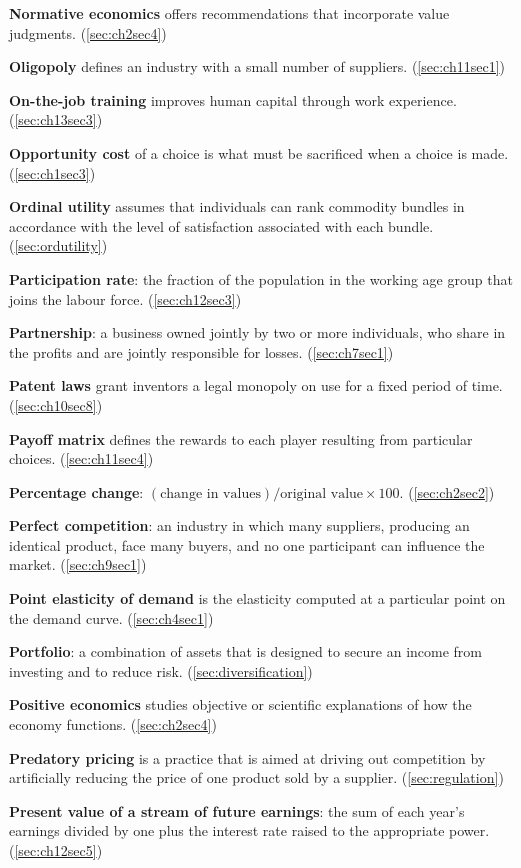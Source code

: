 \textbf{Normative economics} offers recommendations that incorporate value judgments. (\ref{sec:ch2sec4})

\textbf{Oligopoly} defines an industry with a small number of suppliers. (\ref{sec:ch11sec1})

\textbf{On-the-job training} improves human capital through work experience. (\ref{sec:ch13sec3})

\textbf{Opportunity cost} of a choice is what must be sacrificed when a choice is made. (\ref{sec:ch1sec3})

\textbf{Ordinal utility} assumes that individuals can rank commodity bundles in accordance with the level of satisfaction associated with each bundle. (\ref{sec:ordutility})

\textbf{Participation rate}: the fraction of the population in the working age group that joins the labour force. (\ref{sec:ch12sec3})

\textbf{Partnership}: a business owned jointly by two or more individuals, who share in the profits and are jointly responsible for losses. (\ref{sec:ch7sec1})

\textbf{Patent laws} grant inventors a legal monopoly on use for a fixed period of time. (\ref{sec:ch10sec8})

\textbf{Payoff matrix} defines the rewards to each player resulting from particular choices. (\ref{sec:ch11sec4})

\textbf{Percentage change}: $(\text{change in values})/\text{original value}\times 100$. (\ref{sec:ch2sec2})

\textbf{Perfect competition}: an industry in which many suppliers, producing an identical product, face many buyers, and no one participant can influence the market. (\ref{sec:ch9sec1})

\textbf{Point elasticity of demand} is the elasticity computed at a particular point on the demand curve. (\ref{sec:ch4sec1})

\textbf{Portfolio}: a combination of assets that is designed to secure an income from investing and to reduce risk. (\ref{sec:diversification})

\textbf{Positive economics} studies objective or scientific explanations of how the economy functions. (\ref{sec:ch2sec4})

\textbf{Predatory pricing} is a practice that is aimed at driving out competition by artificially reducing the price of one product sold by a supplier. (\ref{sec:regulation})

\textbf{Present value of a stream of future earnings}: the sum of each year's earnings divided by one plus the interest rate raised to the appropriate power. (\ref{sec:ch12sec5})

